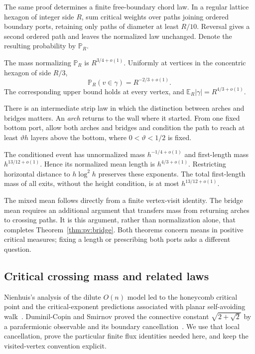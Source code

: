 The same proof determines a finite free-boundary chord law. In a regular
lattice hexagon of integer side $R$, sum critical weights over paths
joining ordered boundary ports, retaining only paths of diameter at
least $R/10$. Reversal gives a second ordered path and leaves the
normalized law unchanged. Denote the resulting probability by
$\mathbb P_R$.

\begin{theorem}\label{thm:pv:hexagon}
The mass normalizing $\mathbb P_R$ is $R^{3/4+o(1)}$. Uniformly at
vertices in the concentric hexagon of side $R/3$,
\[
 \mathbb P_R(v\in\gamma)=R^{-2/3+o(1)}.
\]
The corresponding upper bound holds at every vertex, and
$\mathbb E_R|\gamma|=R^{4/3+o(1)}$.
\end{theorem}

There is an intermediate strip law in which the distinction between
arches and bridges matters. An \emph{arch} returns to the wall where it
started. From one fixed bottom port, allow both arches and bridges and
condition the path to reach at least $\vartheta h$ layers above the
bottom, where $0<\vartheta<1/2$ is fixed.

\begin{proposition}\label{prop:pv:mixed}
The conditioned event has unnormalized mass $h^{-1/4+o(1)}$ and
first-length mass $h^{13/12+o(1)}$. Hence its normalized mean length is
$h^{4/3+o(1)}$. Restricting horizontal distance to $h\log^2h$ preserves
these exponents. The total first-length mass of all exits, without the
height condition, is at most $h^{13/12+o(1)}$.
\end{proposition}

The mixed mean follows directly from a finite vertex-visit identity.
The bridge mean requires an additional argument that transfers mass
from returning arches to crossing paths. It is this argument, rather
than normalization alone, that completes Theorem~\ref{thm:pv:bridge}.
Both theorems concern means in positive critical measures; fixing a
length or prescribing both ports asks a different question.

\subsection{Critical crossing mass and related laws}

Nienhuis's analysis of the dilute $O(n)$ model led to the honeycomb
critical point and the critical-exponent predictions associated with planar
self-avoiding walk~\cite{Nienhuis1982}. Duminil-Copin and Smirnov proved
the connective constant $\sqrt{2+\sqrt2}$ by a parafermionic observable
and its boundary cancellation~\cite{DuminilCopinSmirnov2012}. We use that
local cancellation, prove the particular finite flux identities needed
here, and keep the visited-vertex convention explicit.


